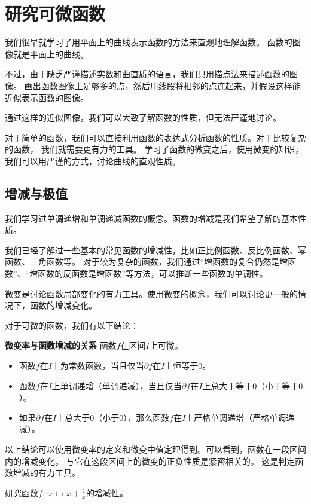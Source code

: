\documentclass[12pt,UTF8]{ctexbook}
\begin{document}
\chapter{研究可微函数}

我们很早就学习了用平面上的曲线表示函数的方法来直观地理解函数。
函数的图像就是平面上的曲线。

不过，由于缺乏严谨描述实数和曲直质的语言，我们只用描点法来描述函数的图像。
画出函数图像上足够多的点，然后用线段将相邻的点连起来，并假设这样能近似表示函数的图像。

通过这样的近似图像，我们可以大致了解函数的性质，但无法严谨地讨论。

对于简单的函数，我们可以直接利用函数的表达式分析函数的性质。对于比较复杂的函数，
我们就需要更有力的工具。
学习了函数的微变之后，使用微变的知识，我们可以用严谨的方式，讨论曲线的直观性质。

\section{增减与极值}

我们学习过单调递增和单调递减函数的概念。函数的增减是我们希望了解的基本性质。

我们已经了解过一些基本的常见函数的增减性，比如正比例函数、反比例函数、幂函数、三角函数等。
对于较为复杂的函数，我们通过“增函数的复合仍然是增函数”、“增函数的反函数是增函数”等方法，可以推断一些函数的单调性。

微变是讨论函数局部变化的有力工具。使用微变的概念，我们可以讨论更一般的情况下，函数的增减变化。

对于可微的函数，我们有以下结论：
\begin{tm}{\textbf{微变率与函数增减的关系}}\label{tm:3-1-0}
    函数$f$在区间$I$上可微。
    \begin{itemize}
        \item 函数$f$在$I$上为常数函数，当且仅当$\partial f$在$I$上恒等于$0$。
        \item 函数$f$在$I$上单调递增（单调递减），当且仅当$\partial f$在$I$上总大于等于$0$（小于等于$0$）。
        \item 如果$\partial f$在$I$上总大于$0$（小于$0$），那么函数$f$在$I$上严格单调递增（严格单调递减）。
    \end{itemize} 
\end{tm}
以上结论可以使用微变率的定义和微变中值定理得到。可以看到，函数在一段区间内的增减变化，
与它在这段区间上的微变的正负性质是紧密相关的。
这是判定函数增减的有力工具。

\begin{et}
    研究函数$f:\,\,x\mapsto x + \frac{1}{x}$的增减性。
\end{et}
\end{document}
